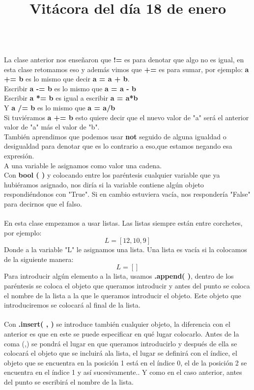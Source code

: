 \documentclass{article}
\begin{document}
	\title{\huge\textbf{Vitácora del día 18 de enero}} \\
	La clase anterior nos enseñaron que \textbf{!=} es para denotar que algo no es igual, en esta clase retomamos eso y además vimos que \textbf{+=} es para sumar, por ejemplo: \textbf{a += b} es lo mismo que decir \textbf{a = a + b}. \\
	Escribir \textbf{a -= b} es lo mismo que \textbf{a = a - b} \\
	Escribir \textbf{a *= b} es igual a escribir \textbf{a = a*b} \\
	Y \textbf{a /= b } es lo mismo que \textbf{a = a/b} \\
	Si tuviéramos \textbf{a += b} esto quiere decir que el nuevo valor de "a" será el anterior valor de "a" más el valor de "b".\\
	También aprendimos que podemos usar \textbf{not} seguido de alguna igualdad o desigualdad para denotar que es lo contrario a eso,que estamos negando esa expresión. \\
	A una variable le asignamos como valor una cadena. \\
	Con \textbf{bool ( )} y colocando entre los paréntesis cualquier variable que ya hubiéramos asignado, nos diría si la variable contiene algún objeto respondiéndonos con "True". Si en cambio estuviera vacía, nos respondería "False" para decirnos que el falso. \\ \\
	En esta clase empezamos a usar listas. Las listas siempre están entre corchetes, por ejemplo: \[ L = [12, 10, 9]  \]
	Donde a la variable "L" le asignamos una lista. Una lista es vacía si la colocamos de la siguiente manera:  \[ L = []  \]
	Para introducir algún elemento a la lista, usamos \textbf{.append( )}, dentro de los paréntesis se coloca el objeto que queramos introducir y antes del punto se coloca el nombre de la lista a la que le queramos introducir el objeto. Este objeto que introduciremos se colocará al final de la lista. \\ \\
	Con \textbf{.insert( , )} se introduce también cualquier objeto, la diferencia con el anterior es que en este se puede especificar en qué lugar colocarlo. Antes de la coma (,) se pondrá el lugar en que queramos introducirlo y después de ella se colocará el objeto que se incluirá ala lista, el lugar se definirá con el índice, el objeto que se encuentra en la posición 1 está en el índice 0, el de la posición 2 se encuentra en el índice 1 y así sucesivamente.. Y como en el caso anterior, antes del punto se escribirá el nombre de la lista. \\ \\
\end{document}
